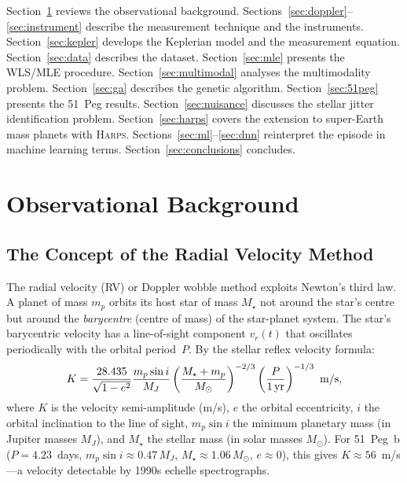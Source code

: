 \documentclass[12pt]{article}
\begin{document}
Section~\ref{sec:background} reviews the observational background.
Sections~\ref{sec:doppler}--\ref{sec:instrument} describe the measurement
technique and the instruments.
Section~\ref{sec:kepler} develops the Keplerian model and the
measurement equation.
Section~\ref{sec:data} describes the dataset.
Section~\ref{sec:mle} presents the WLS/MLE procedure.
Section~\ref{sec:multimodal} analyses the multimodality problem.
Section~\ref{sec:ga} describes the genetic algorithm.
Section~\ref{sec:51peg} presents the 51~Peg results.
Section~\ref{sec:nuisance} discusses the stellar jitter identification
problem.
Section~\ref{sec:harps} covers the extension to
super-Earth mass planets with \textsc{Harps}.
Sections~\ref{sec:ml}--\ref{sec:dnn} reinterpret the episode
in machine learning terms.
Section~\ref{sec:conclusions} concludes.

\section{Observational Background}
\label{sec:background}

\subsection{The Concept of the Radial Velocity Method}

The radial velocity (RV) or Doppler wobble method exploits Newton's
third law.  A planet of mass $m_p$ orbits its host star of mass $M_\star$
not around the star's centre but around the \emph{barycentre} (centre of
mass) of the star-planet system.  The star's barycentric velocity has
a line-of-sight component $v_r(t)$ that oscillates periodically with
the orbital period~$P$.  By the stellar reflex velocity formula:
\begin{equation}\label{eq:K_def}
  K = \frac{28.435}{\sqrt{1-e^2}}
  \frac{m_p \sin i}{M_J}
  \left(\frac{M_\star + m_p}{M_\odot}\right)^{-2/3}
  \left(\frac{P}{1\,\rm yr}\right)^{-1/3}~\text{m/s},
\end{equation}
where $K$ is the velocity semi-amplitude (m/s), $e$ the orbital
eccentricity, $i$ the orbital inclination to the line of sight,
$m_p\sin i$ the minimum planetary mass (in Jupiter masses $M_J$),
and $M_\star$ the stellar mass (in solar masses $M_\odot$).
For 51~Peg~b ($P = 4.23$~days, $m_p\sin i \approx 0.47\,M_J$,
$M_\star \approx 1.06\,M_\odot$, $e \approx 0$), this gives
$K \approx 56$~m/s---a velocity detectable by 1990s echelle
spectrographs.
\end{document}
